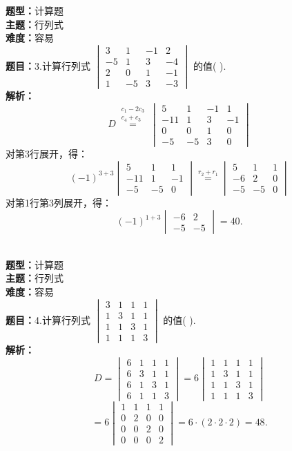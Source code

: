 \documentclass{ctexart}
\newenvironment{question}[5]{%
	\noindent\textbf{题型：}#1\\
	\textbf{主题：}#2\\
	\textbf{难度：}#3\\
	\textbf{题目：}#4\\
	\textbf{解析：}#5\\
	\vspace{1em}
}{}
\begin{document}
	\begin{question}
		{计算题}
		{行列式}
		{容易}
		{3.计算行列式 $\begin{vmatrix}3 & 1 & -1 & 2 \\ -5 & 1 & 3 & -4 \\ 2 & 0 & 1 & -1 \\ 1 & -5 & 3 & -3\end{vmatrix}$ 的值(  ).}
		{
			\[
			D \stackrel{\substack{c_1-2c_3 \\ c_4+c_3}}{=}
			\begin{vmatrix}
				5 & 1 & -1 & 1 \\
				-11 & 1 & 3 & -1 \\
				0 & 0 & 1 & 0 \\
				-5 & -5 & 3 & 0
			\end{vmatrix}
			\]
			对第3行展开，得：
			\[
			(-1)^{3+3}\begin{vmatrix}
				5 & 1 & 1 \\
				-11 & 1 & -1 \\
				-5 & -5 & 0
			\end{vmatrix} \stackrel{r_2+r_1}{=}
			\begin{vmatrix}
				5 & 1 & 1 \\
				-6 & 2 & 0 \\
				-5 & -5 & 0
			\end{vmatrix}
			\]
			对第1行第3列展开，得：
			\[
			(-1)^{1+3} \begin{vmatrix}
				-6 & 2 \\
				-5 & -5
			\end{vmatrix} = 40.
			\]}
	\end{question}
	
	
	\begin{question}
		{计算题}
		{行列式}
		{容易}
		{4.计算行列式 $\begin{vmatrix}3 & 1 & 1 & 1 \\ 1 & 3 & 1 & 1 \\ 1 & 1 & 3 & 1 \\ 1 & 1 & 1 & 3\end{vmatrix}$ 的值(  ).}
		{
			\[
			D = \begin{vmatrix}
				6 & 1 & 1 & 1 \\
				6 & 3 & 1 & 1 \\
				6 & 1 & 3 & 1 \\
				6 & 1 & 1 & 3
			\end{vmatrix} = 6
			\begin{vmatrix}
				1 & 1 & 1 & 1 \\
				1 & 3 & 1 & 1 \\
				1 & 1 & 3 & 1 \\
				1 & 1 & 1 & 3
			\end{vmatrix}
			\]
			\[
			= 6
			\begin{vmatrix}
				1 & 1 & 1 & 1 \\
				0 & 2 & 0 & 0 \\
				0 & 0 & 2 & 0 \\
				0 & 0 & 0 & 2
			\end{vmatrix} = 6 \cdot (2 \cdot 2 \cdot 2) = 48.
			\]}
	\end{question}
	
\end{document}
